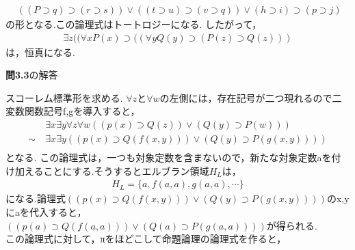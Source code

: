\documentclass[11pt,dvipdfmx]{jreport}
\begin{document}
\begin{enumerate}
\begin{equation*}
  \begin{array}{lll}
    & ((P \supset q) \supset (r \supset s)) \lor ((t \supset u) \supset (v \supset q)) \lor (h \supset i) \supset (p \supset j)& 
  \end{array}
\end{equation*}
の形となる.この論理式はトートロジーになる.
したがって，
 \begin{equation*}
    \begin{array}{lll}
      & \exists z (( \forall x P(x) \supset ((\forall y  Q(y) \supset (P(z) \supset Q(z))) & 
    \end{array}
  \end{equation*}
は，恒真になる.

\end{enumerate}



\noindent \textbf{問3.3}の解答 
\par
スコーレム標準形を求める.
$\forall z$と$\forall w$の左側には，存在記号が二つ現れるので二変数関数記号f,gを導入すると，\\
\renewcommand{\labelenumi}{\arabic{enumi}) }
  \begin{equation*}
  \begin{array}{lll}
   & \exists x \exists y \forall z \forall w ((p(x) \supset Q(z)) \lor (Q(y)\supset P(w)))\\
    \sim \ & \exists x \exists y ((p(x) \supset Q(f(x,y))) \lor (Q(y)\supset P(g(x,y))))\\
  \end{array}
  \end{equation*}
となる.
この論理式は，一つも対象定数を含まないので，新たな対象定数aを付け加えることにする.そうするとエルブラン領域$H_L$は，\\
\begin{equation*}
  \begin{array}{lll}
    & H_L = \{a,f(a,a),g(a,a),\cdots \} & 
  \end{array}
\end{equation*}
になる.論理式$((p(x) \supset Q(f(x,y))) \lor (Q(y)\supset P(g(x,y))))$のx,yにaを代入すると，
$((p(a) \supset Q(f(a,a))) \lor (Q(a)\supset P(g(a,a))))$が得られる.\\
この論理式に対して，πをほどこして命題論理の論理式を作ると，
\end{document}
